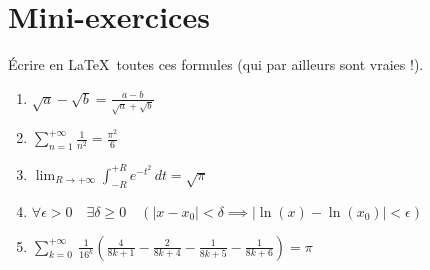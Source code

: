 \section*{Mini-exercices}



\begin{frame}

\begin{miniexercice}
\'Ecrire en \LaTeX\ toutes ces formules (qui par ailleurs sont vraies !).
\begin{enumerate}
  \setlength{\itemsep}{1em}

  \item $\displaystyle \sqrt{a}-\sqrt{b} = \frac{a-b}{\sqrt a + \sqrt b}$
  \item $\displaystyle \sum_{n=1}^{+\infty}{\frac{1}{n^2}} = \frac{\pi^2}{6}$
  \item $\displaystyle \lim_{R\to+\infty} \int_{-R}^{+R} e^{-t^2} \, dt = \sqrt{\pi}$
  \item $\displaystyle \forall \epsilon>0 \quad \exists \delta \ge 0 \quad (|x-x_0|<\delta \implies |\ln(x)-\ln(x_0)|<\epsilon)$
  \item $\displaystyle \sum_{k=0}^{+\infty} \ \frac{1}{16^k} \left(\frac{4}{8k+1}-\frac{2}{8k+4}-\frac{1}{8k+5}-\frac{1}{8k+6} \right) = \pi$

\end{enumerate}
\end{miniexercice}
\end{frame}




